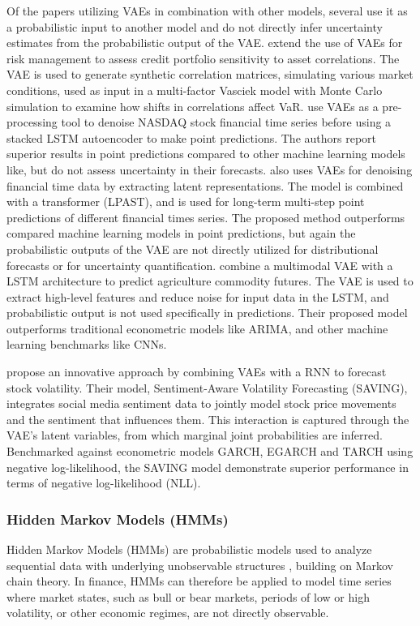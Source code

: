 Of the papers utilizing VAEs in combination with other models, several use it as a probabilistic input to another model and do not directly infer uncertainty estimates from the probabilistic output of the VAE.  
\textcite{caprioli2023quantifying} extend the use of VAEs for risk management to assess credit portfolio sensitivity to asset correlations. The VAE is used to generate synthetic correlation matrices, simulating various market conditions, used as input in a multi-factor Vasciek model with Monte Carlo simulation to examine how shifts in correlations affect VaR. \textcite{choudhury2020enhancing} use VAEs as a pre-processing tool to denoise NASDAQ stock financial time series before using a stacked LSTM autoencoder to make point predictions. The authors report superior results in point predictions compared to other machine learning models like, but do not assess uncertainty in their forecasts.  \textcite{tang2024period} also uses VAEs for denoising financial time data by extracting latent representations. The model is combined with a transformer (LPAST), and is used for long-term multi-step point predictions of different financial times series. The proposed method outperforms compared machine learning models in point predictions, but again the probabilistic outputs of the VAE are not directly utilized for distributional forecasts or for uncertainty quantification. \textcite{li2020multivariate} combine a multimodal VAE with a LSTM architecture to predict agriculture commodity futures. The VAE is used to extract high-level features and reduce noise for input data in the LSTM, and probabilistic output is not used specifically in predictions. Their proposed model outperforms traditional econometric models like ARIMA, and other machine learning benchmarks like CNNs. 

\textcite{xing2019sentiment} propose an innovative approach by combining VAEs with a RNN to forecast stock volatility. Their model, Sentiment-Aware Volatility Forecasting (SAVING), integrates social media sentiment data to jointly model stock price movements and the sentiment that influences them. This interaction is captured through the VAE's latent variables, from which marginal joint probabilities are inferred. Benchmarked against econometric models GARCH, EGARCH and TARCH using negative log-likelihood, the SAVING model demonstrate superior performance in terms of negative log-likelihood (NLL).


\subsubsection{Hidden Markov Models (HMMs)}
Hidden Markov Models (HMMs) are probabilistic models used to analyze sequential data with underlying unobservable structures \parencite{rabiner1986introduction}, building on Markov chain theory. In finance, HMMs can therefore be applied to model time series where market states, such as bull or bear markets, periods of low or high volatility, or other economic regimes, are not directly observable. 

